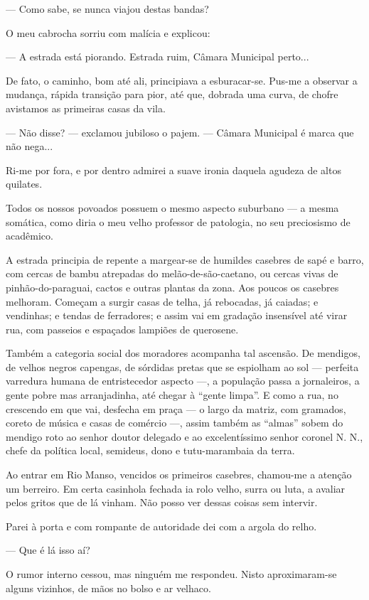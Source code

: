 --- Como sabe, se nunca viajou destas bandas?

O meu cabrocha sorriu com malícia e explicou:

--- A estrada está piorando. Estrada ruim, Câmara Municipal perto...

De fato, o caminho, bom até ali, principiava a esburacar-se. Pus-me a
observar a mudança, rápida transição para pior, até que, dobrada uma
curva, de chofre avistamos as primeiras casas da vila.

--- Não disse? --- exclamou jubiloso o pajem. --- Câmara Municipal é
marca que não nega...

Ri-me por fora, e por dentro admirei a suave ironia daquela agudeza de
altos quilates.

Todos os nossos povoados possuem o mesmo aspecto suburbano --- a mesma
somática, como diria o meu velho professor de patologia, no seu
preciosismo de acadêmico.

A estrada principia de repente a margear-se de humildes casebres de sapé
e barro, com cercas de bambu atrepadas do melão-de-são-caetano, ou
cercas vivas de pinhão-do-paraguai, cactos e outras plantas da zona. Aos
poucos os casebres melhoram. Começam a surgir casas de telha, já
rebocadas, já caiadas; e vendinhas; e tendas de ferradores; e assim vai
em gradação insensível até virar rua, com passeios e espaçados lampiões
de querosene.

Também a categoria social dos moradores acompanha tal ascensão. De
mendigos, de velhos negros capengas, de sórdidas pretas que se espiolham
ao sol --- perfeita varredura humana de entristecedor aspecto ---, a
população passa a jornaleiros, a gente pobre mas arranjadinha, até
chegar à ``gente limpa''. E como a rua, no crescendo em que vai,
desfecha em praça --- o largo da matriz, com gramados, coreto de música
e casas de comércio ---, assim também as ``almas'' sobem do mendigo roto
ao senhor doutor delegado e ao excelentíssimo senhor coronel N. N.,
chefe da política local, semideus, dono e tutu-marambaia da terra.

Ao entrar em Rio Manso, vencidos os primeiros casebres, chamou-me a
atenção um berreiro. Em certa casinhola fechada ia rolo velho, surra ou
luta, a avaliar pelos gritos que de lá vinham. Não posso ver dessas
coisas sem intervir.

Parei à porta e com rompante de autoridade dei com a argola do relho.

--- Que é lá isso aí?

O rumor interno cessou, mas ninguém me respondeu. Nisto aproximaram-se
alguns vizinhos, de mãos no bolso e ar velhaco.

